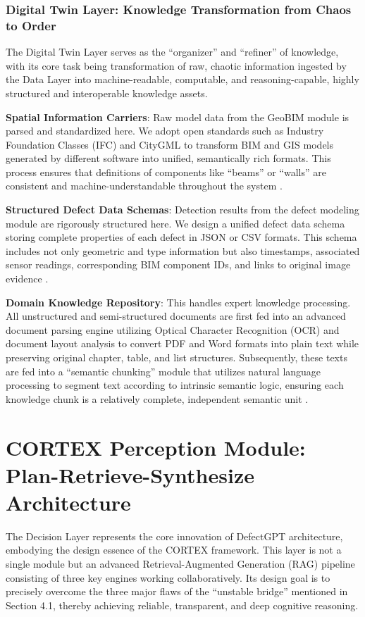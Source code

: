 \subsubsection{Digital Twin Layer: Knowledge Transformation from Chaos to Order}

The Digital Twin Layer serves as the ``organizer'' and ``refiner'' of knowledge, with its core task being transformation of raw, chaotic information ingested by the Data Layer into machine-readable, computable, and reasoning-capable, highly structured and interoperable knowledge assets.

\textbf{Spatial Information Carriers}: Raw model data from the GeoBIM module is parsed and standardized here. We adopt open standards such as Industry Foundation Classes (IFC) and CityGML to transform BIM and GIS models generated by different software into unified, semantically rich formats. This process ensures that definitions of components like ``beams'' or ``walls'' are consistent and machine-understandable throughout the system \cite{tang2019retrieving}.

\textbf{Structured Defect Data Schemas}: Detection results from the defect modeling module are rigorously structured here. We design a unified defect data schema storing complete properties of each defect in JSON or CSV formats. This schema includes not only geometric and type information but also timestamps, associated sensor readings, corresponding BIM component IDs, and links to original image evidence \cite{li2024single}.

\textbf{Domain Knowledge Repository}: This handles expert knowledge processing. All unstructured and semi-structured documents are first fed into an advanced document parsing engine utilizing Optical Character Recognition (OCR) and document layout analysis to convert PDF and Word formats into plain text while preserving original chapter, table, and list structures. Subsequently, these texts are fed into a ``semantic chunking'' module that utilizes natural language processing to segment text according to intrinsic semantic logic, ensuring each knowledge chunk is a relatively complete, independent semantic unit \cite{fan2023retrieval}.

\section{CORTEX Perception Module: Plan-Retrieve-Synthesize Architecture}

The Decision Layer represents the core innovation of DefectGPT architecture, embodying the design essence of the CORTEX framework. This layer is not a single module but an advanced Retrieval-Augmented Generation (RAG) pipeline consisting of three key engines working collaboratively. Its design goal is to precisely overcome the three major flaws of the ``unstable bridge'' mentioned in Section 4.1, thereby achieving reliable, transparent, and deep cognitive reasoning.

